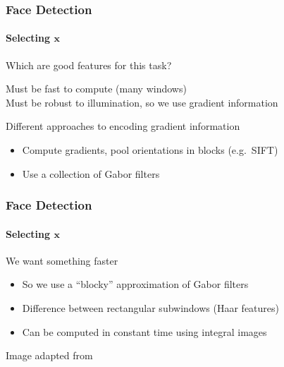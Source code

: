 \documentclass[xetex,professionalfont]{beamer}
\renewcommand{\vec}[1]{\ensuremath{\mathbf{#1}}}
\newcommand{\vx}{\vec{x}}
\renewcommand\emph[1]{\textcolor{tuwcvl_inf_red}{#1}}
\begin{document}

\begin{frame}
\frametitle{Face Detection}
\framesubtitle{Selecting $\vx$}

Which are good features for this task?

\bigskip
Must be fast to compute (many windows) \\
Must be robust to illumination, so we use gradient information %

\bigskip
Different approaches to encoding gradient information
\begin{itemize}
    \item Compute gradients, pool orientations in blocks (e.g.\ SIFT) %
    \item Use a collection of Gabor filters %
\end{itemize}

\end{frame}


\begin{frame}
\frametitle{Face Detection}
\framesubtitle{Selecting $\vx$}

We want something faster
\begin{itemize}
    \item So we use a \enquote{blocky} approximation of Gabor filters
    \item Difference between rectangular subwindows (\emph{Haar features})
    \item Can be computed in constant time using integral images
\end{itemize}

\medskip
\begin{center}
    {\centering Image adapted from \cite{prince12}}
\end{center}

\end{frame}
\end{document}
